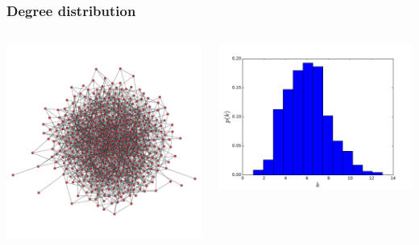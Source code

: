 \documentclass{beamer}
\begin{document}
\begin{frame}
    \frametitle{Degree distribution}
    \begin{columns}
        \centering
        \includegraphics[width=\columnwidth]{big_graph.pdf}

        \includegraphics[width=\columnwidth]{deg_distri_example.pdf}
        \centering
    \end{columns}
\end{frame}
\end{document}
